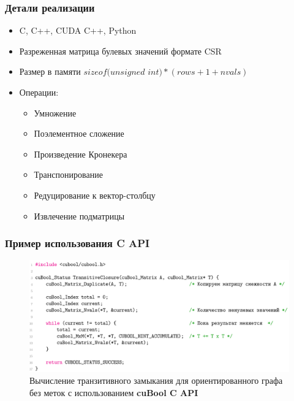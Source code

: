 \documentclass[xcolor=table,english]{beamer}
\begin{document}
\begin{frame}[fragile] \frametitle{Детали реализации}
    \begin{itemize}
        \item C, C++, CUDA C++, Python
        \item Разреженная матрица булевых значений формате CSR
        \item Размер в памяти $\textit{sizeof(unsigned int)} * (\textit{rows} + 1 + \textit{nvals})$
        \item Операции: 
        {
        \begin{itemize}
            \item Умножение
            \item Поэлементное сложение
            \item Произведение Кронекера
            \item Транспонирование
            \item Редуцирование к вектор-столбцу
            \item Извлечение подматрицы
        \end{itemize}
        }
    \end{itemize}
\end{frame}

\begin{frame}[fragile] \frametitle{Пример использования C API}
    \begin{center} 
    \begin{minipage}[m]{0.9\linewidth}
        \begin{figure}
            \centering
            \includegraphics[width=\textwidth]{figures/tc_c_api.png}
            \caption{Вычисление транзитивного замыкания для ориентированного графа без меток с использованием \textbf{cuBool C API}}
        \end{figure}
    \end{minipage}\hfill    
    \end{center}   
\end{frame}
\end{document}

